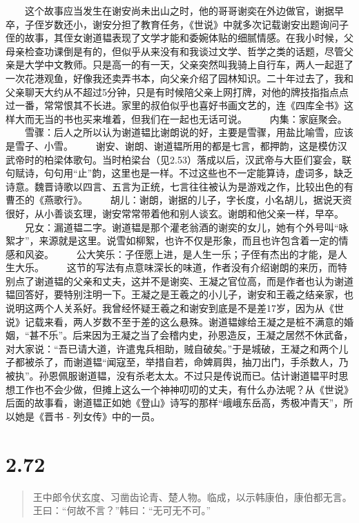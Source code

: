\documentclass[]{book}
\begin{document}
　　这个故事应当发生在谢安尚未出山之时，他的哥哥谢奕在外边做官，谢据早卒，子侄岁数还小，谢安分担了教育任务，《世说》中就多次记载谢安出题询问子侄的故事，其侄女谢道韫表现了文学才能和委婉体贴的细腻情感。在我小时候，父母亲检查功课倒是有的，但似乎从来没有和我谈过文学、哲学之类的话题，尽管父亲是大学中文教师。只是高一的有一天，父亲突然叫我骑上自行车，两人一起逛了一次花港观鱼，好像我还卖弄书本，向父亲介绍了园林知识。二十年过去了，我和父亲聊天大约从不超过5分钟，只是有时候陪父亲上网打牌，对他的牌技指指点点过一番，常常恨其不长进。家里的叔伯似乎也喜好书画文艺的，连《四库全书》这样大而无当的书也买来堆着，但我们在一起也无话可说。
　　内集：家庭聚会。
　　雪骤：后人之所以认为谢道韫比谢朗说的好，主要是雪骤，用盐比喻雪，应该是雪子、小雪。
　　谢安、谢朗、谢道韫所用的都是七言，都押韵，这是模仿汉武帝时的柏梁体歌句。当时柏梁台（见2.53）落成以后，汉武帝与大臣们宴会，联句赋诗，句句用``止''韵，这里也是一样。不过这些也不一定能算诗，虚词多，缺乏诗意。魏晋诗歌以四言、五言为正统，七言往往被认为是游戏之作，比较出色的有曹丕的《燕歌行》。
　　胡儿：谢朗，谢据的儿子，字长度，小名胡儿，据说天资很好，从小善谈玄理，谢安常常带着他和别人谈玄。谢朗和他父亲一样，早卒。
　　兄女：漏道韫二字。谢道韫是那个灌老翁酒的谢奕的女儿，她有个外号叫``咏絮才''，来源就是这里。说雪如柳絮，也许不仅是形象，而且也许包含着一定的情感和风姿。
　　公大笑乐：子侄愿上进，是人生一乐；子侄有杰出的才能，是人生大乐。
　　这节的写法有点意味深长的味道，作者没有介绍谢朗的来历，而特别点了谢道韫的父亲和丈夫，这并不是谢奕、王凝之官位高，而是作者也认为谢道韫回答好，要特别注明一下。王凝之是王羲之的小儿子，谢安和王羲之结亲家，也说明这两个人关系好。我曾经怀疑王羲之和谢安到底是不是差17岁，因为从《世说》记载来看，两人岁数不至于差的这么悬殊。谢道韫嫁给王凝之是桩不满意的婚姻，``甚不乐''。后来因为王凝之当了会稽内史，孙恩造反，王凝之居然不休武备，对大家说：``吾已请大道，许遣鬼兵相助，贼自破矣。''于是城破，王凝之和两个儿子都被杀了，而谢道韫``闻寇至，举措自若，命婢肩舆，抽刀出门，手杀数人，乃被执''。孙恩佩服谢道韫，没有杀老太太。不过只是传说而已。估计谢道韫平时思想工作也不会少做，但摊上这么一个神神叨叨的丈夫，有什么办法呢？从《世说》后面的故事看，谢道韫正如她《登山》诗写的那样``峨峨东岳高，秀极冲青天''，所以她是《晋书
- 列女传》中的一员。

\section{2.72}\label{section-118}

\begin{quote}
王中郎令伏玄度、习凿齿论青、楚人物。临成，以示韩康伯，康伯都无言。王曰：``何故不言？''韩曰：``无可无不可。''
\end{quote}
\end{document}
